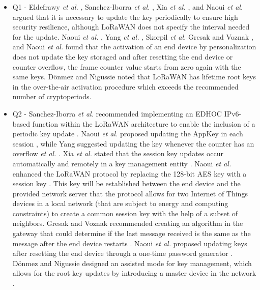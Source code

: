 \documentclass[manuscript,screen,review=false]{acmart}
\begin{document}
\begin{itemize}
\item Q1 - Eldefrawy {\it et al.} \cite{01_formal_security_analysis_LoRaWAN}, Sanchez-Iborra {\it et al.} \cite{31_internet_access_lorawan_devices}, Xia {\it et al.} \cite{56_session_key_management}, and Naoui {\it et al.} \cite{57_session_key_management} argued that it is necessary to update the key periodically to ensure high security resilience, although LoRaWAN does not specify the interval needed for the update. Naoui {\it et al.} \cite{35_third_party_key_management}, Yang {\it et al.} \cite{37_security_vulnerabilities_lorawan}, Skorpil {\it et al.} \cite{59_IoT_security_overview_practical_demonstration} Gresak and Voznak \cite{97_protecting_gateway}, and Naoui {\it et al.} \cite{98_lorawan_framework_smarthome} found that the activation of an end device by personalization does not update the key storaged and after resetting the end device or counter overflow, the frame counter value starts from zero again with the same keys. D\"onmez and Nigussie \cite{109_key_management_healthcare} noted that LoRaWAN has lifetime root keys in the over-the-air activation procedure which exceeds the recommended number of cryptoperiods.

\item Q2 - Sanchez-Iborra {\it et al.} recommended implementing an EDHOC IPv6-based function within the LoRaWAN architecture to enable the inclusion of a periodic key update \cite{31_internet_access_lorawan_devices}. Naoui {\it et al.} proposed updating the AppKey in each session \cite{35_third_party_key_management}, while Yang suggested updating the key whenever the counter has an overflow {\it et al.} \cite{37_security_vulnerabilities_lorawan}. Xia {\it et al.} stated that the session key updates occur automatically and remotely in a key management entity \cite{56_session_key_management}. Naoui {\it et al.} enhanced the LoRaWAN protocol by replacing the 128-bit AES key with a session key \cite{57_session_key_management}. This key will be established between the end device and the provided network server that the protocol allows for two Internet of Things devices in a local network (that are subject to energy and computing constraints) to create a common session key with the help of a subset of neighbors. Gresak and Voznak recommended creating an algorithm in the gateway that could determine if the last message received is the same as the message after the end device restarts \cite{97_protecting_gateway}. Naoui {\it et al.} proposed updating keys after resetting the end device through a one-time password generator \cite{98_lorawan_framework_smarthome}. D\"onmez and Nigussie designed an assisted mode for key management, which allows for the root key updates by introducing a master device in the network \cite{109_key_management_healthcare}.


\end{itemize}
\end{document}
